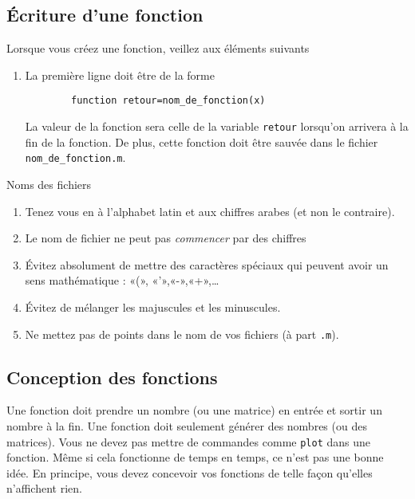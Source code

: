 \subsection{Écriture d'une fonction}

Lorsque vous créez une fonction, veillez aux éléments suivants 
\begin{enumerate}

	\item
		La première ligne doit être de la forme
		\begin{verbatim}
		function retour=nom_de_fonction(x)
		\end{verbatim}
		La valeur de la fonction sera celle de la variable \verb+retour+ lorsqu'on arrivera à la fin de la fonction. De plus, cette fonction doit être sauvée dans le fichier \verb+nom_de_fonction.m+.

\end{enumerate}

Noms des fichiers
\begin{enumerate}
	\item
		Tenez vous en à l'alphabet latin et aux chiffres arabes (et non le contraire).
	\item
		Le nom de fichier ne peut pas \emph{commencer} par des chiffres
	\item
		Évitez absolument de mettre des caractères spéciaux qui peuvent avoir un sens mathématique : «(», «'»,«-»,«+»,\ldots
	\item
		Évitez de mélanger les majuscules et les minuscules. %
	\item
		Ne mettez pas de points dans le nom de vos fichiers (à part \verb+.m+).
\end{enumerate}

\subsection{Conception des fonctions}

Une fonction doit prendre un nombre (ou une matrice) en entrée et sortir un nombre à la fin. Une fonction doit seulement générer des nombres (ou des matrices). Vous ne devez pas mettre de commandes comme \verb+plot+ dans une fonction. Même si cela fonctionne de temps en temps, ce n'est pas une bonne idée. En principe, vous devez concevoir vos fonctions de telle façon qu'elles n'affichent rien.

